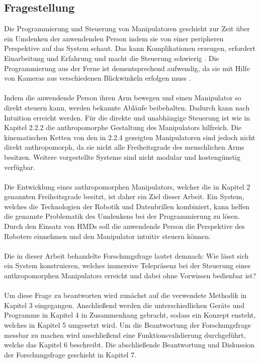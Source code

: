 \subsection{Fragestellung}
  Die Programmierung und Steuerung von Manipulatoren geschieht zur Zeit über ein Umdenken der anwendenden Person indem sie von einer peripheren Perspektive auf das System schaut. Das kann Komplikationen erzeugen, erfordert Einarbeitung und Erfahrung und macht die Steuerung schwierig \cite[S. 190]{ehlers_echtzeitfahige_2019}. Die Programmierung aus der Ferne ist dementsprechend aufwendig, da sie mit Hilfe von Kameras aus verschiedenen Blickwinkeln erfolgen muss \cite[S. 1347]{smith_dual_2012}.\\\\
  Indem die anwendende Person ihren Arm bewegen und einen Manipulator so direkt steuern kann, werden bekannte Abläufe beibehalten. Dadurch kann nach \cite{blackler_towards_2007} Intuition erreicht werden. Für die direkte und unabhängige Steuerung ist wie in Kapitel 2.2.2 die anthropomorphe Gestaltung des Manipulators hilfreich. Die kinematischen Ketten von den in 2.2.4 gezeigten Manipulatoren sind jedoch nicht direkt anthropomorph, da sie nicht alle Freiheitsgrade des menschlichen Arms besitzen. Weitere vorgestellte Systeme sind nicht modular und kostengünstig verfügbar.\\\\
  Die Entwicklung eines anthropomorphen Manipulators, welcher die in Kapitel 2 genannten Freiheitsgrade besitzt, ist daher ein Ziel dieser Arbeit. Ein System, welches die Technologien der Robotik und Datenbrillen kombiniert, kann helfen die genannte Problematik des Umdenkens bei der Programmierung zu lösen. Durch den Einsatz von HMDs soll die anwendende Person die Perspektive des Roboters einnehmen und den Manipulator intuitiv steuern können.\\\\
  Die in dieser Arbeit behandelte Forschungsfrage lautet demnach: Wie lässt sich ein System konstruieren, welches immersive Telepräsenz bei der Steuerung eines anthropomorphen Manipulators erreicht und dabei ohne Vorwissen bedienbar ist?\\\\
  Um diese Frage zu beantworten wird zunächst auf die verwendete Methodik in Kapitel 3 eingegangen. Anschließend werden die unterschiedlichen Geräte und Programme in Kapitel 4 in Zusammenhang gebracht, sodass ein Konzept ensteht, welches in Kapitel 5 umgesetzt wird. Um die Beantwortung der Forschungsfrage messbar zu machen wird anschließend eine Funktionsvalidierung durchgeführt, welche das Kapitel 6 beschreibt. Die abschließende Beantwortung und Diskussion der Forschungsfrage geschieht in Kapitel 7.
